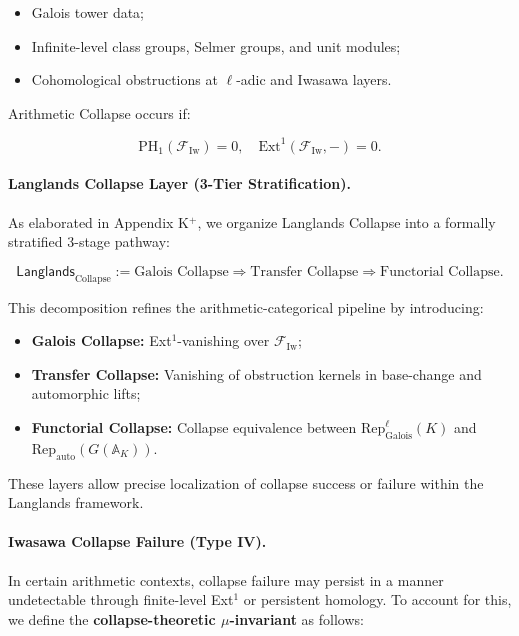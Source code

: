 \documentclass[11pt]{article}
\begin{document}
\begin{itemize}
    \item Galois tower data;
    \item Infinite-level class groups, Selmer groups, and unit modules;
    \item Cohomological obstructions at $\ell$-adic and Iwasawa layers.
\end{itemize}

Arithmetic Collapse occurs if:

\[
\mathrm{PH}_1(\mathcal{F}_{\mathrm{Iw}}) = 0, \quad \mathrm{Ext}^1(\mathcal{F}_{\mathrm{Iw}}, -) = 0.
\]

\paragraph{Langlands Collapse Layer (3-Tier Stratification).}

As elaborated in Appendix K$^+$, we organize Langlands Collapse into a formally stratified 3-stage pathway:

\[
\mathsf{Langlands}_{\mathrm{Collapse}} :=
\text{Galois Collapse}
\Rightarrow
\text{Transfer Collapse}
\Rightarrow
\text{Functorial Collapse}.
\]

This decomposition refines the arithmetic-categorical pipeline by introducing:

\begin{itemize}
    \item \textbf{Galois Collapse:} Ext$^1$-vanishing over \( \mathcal{F}_{\mathrm{Iw}} \);
    \item \textbf{Transfer Collapse:} Vanishing of obstruction kernels in base-change and automorphic lifts;
    \item \textbf{Functorial Collapse:} Collapse equivalence between \( \mathrm{Rep}_{\mathrm{Galois}}^\ell(K) \) and \( \mathrm{Rep}_{\mathrm{auto}}(G(\mathbb{A}_K)) \).
\end{itemize}

These layers allow precise localization of collapse success or failure within the Langlands framework.

\paragraph{Iwasawa Collapse Failure (Type IV).}

In certain arithmetic contexts, collapse failure may persist in a manner undetectable through finite-level Ext$^1$ or persistent homology. To account for this, we define the \textbf{collapse-theoretic $\mu$-invariant} as follows:
\end{document}
